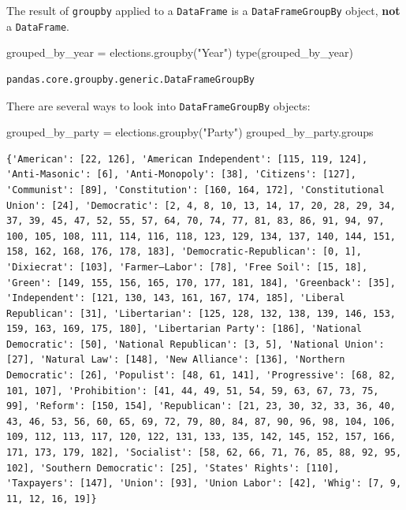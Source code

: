 \documentclass[
  letterpaper,
  DIV=11,
  numbers=noendperiod]{scrreprt}
\newenvironment{Shaded}{\begin{snugshade}}{\end{snugshade}}
\newcommand{\BuiltInTok}[1]{\textcolor[rgb]{0.00,0.23,0.31}{#1}}
\newcommand{\NormalTok}[1]{\textcolor[rgb]{0.00,0.23,0.31}{#1}}
\newcommand{\OperatorTok}[1]{\textcolor[rgb]{0.37,0.37,0.37}{#1}}
\newcommand{\StringTok}[1]{\textcolor[rgb]{0.13,0.47,0.30}{#1}}
\begin{document}
The result of \texttt{groupby} applied to a \texttt{DataFrame} is a
\texttt{DataFrameGroupBy} object, \textbf{not} a \texttt{DataFrame}.

\begin{Shaded}
\begin{Highlighting}[]
\NormalTok{grouped\_by\_year }\OperatorTok{=}\NormalTok{ elections.groupby(}\StringTok{"Year"}\NormalTok{)}
\BuiltInTok{type}\NormalTok{(grouped\_by\_year)}
\end{Highlighting}
\end{Shaded}

\begin{verbatim}
pandas.core.groupby.generic.DataFrameGroupBy
\end{verbatim}

There are several ways to look into \texttt{DataFrameGroupBy} objects:

\begin{Shaded}
\begin{Highlighting}[]
\NormalTok{grouped\_by\_party }\OperatorTok{=}\NormalTok{ elections.groupby(}\StringTok{"Party"}\NormalTok{)}
\NormalTok{grouped\_by\_party.groups}
\end{Highlighting}
\end{Shaded}

\begin{verbatim}
{'American': [22, 126], 'American Independent': [115, 119, 124], 'Anti-Masonic': [6], 'Anti-Monopoly': [38], 'Citizens': [127], 'Communist': [89], 'Constitution': [160, 164, 172], 'Constitutional Union': [24], 'Democratic': [2, 4, 8, 10, 13, 14, 17, 20, 28, 29, 34, 37, 39, 45, 47, 52, 55, 57, 64, 70, 74, 77, 81, 83, 86, 91, 94, 97, 100, 105, 108, 111, 114, 116, 118, 123, 129, 134, 137, 140, 144, 151, 158, 162, 168, 176, 178, 183], 'Democratic-Republican': [0, 1], 'Dixiecrat': [103], 'Farmer–Labor': [78], 'Free Soil': [15, 18], 'Green': [149, 155, 156, 165, 170, 177, 181, 184], 'Greenback': [35], 'Independent': [121, 130, 143, 161, 167, 174, 185], 'Liberal Republican': [31], 'Libertarian': [125, 128, 132, 138, 139, 146, 153, 159, 163, 169, 175, 180], 'Libertarian Party': [186], 'National Democratic': [50], 'National Republican': [3, 5], 'National Union': [27], 'Natural Law': [148], 'New Alliance': [136], 'Northern Democratic': [26], 'Populist': [48, 61, 141], 'Progressive': [68, 82, 101, 107], 'Prohibition': [41, 44, 49, 51, 54, 59, 63, 67, 73, 75, 99], 'Reform': [150, 154], 'Republican': [21, 23, 30, 32, 33, 36, 40, 43, 46, 53, 56, 60, 65, 69, 72, 79, 80, 84, 87, 90, 96, 98, 104, 106, 109, 112, 113, 117, 120, 122, 131, 133, 135, 142, 145, 152, 157, 166, 171, 173, 179, 182], 'Socialist': [58, 62, 66, 71, 76, 85, 88, 92, 95, 102], 'Southern Democratic': [25], 'States' Rights': [110], 'Taxpayers': [147], 'Union': [93], 'Union Labor': [42], 'Whig': [7, 9, 11, 12, 16, 19]}
\end{verbatim}
\end{document}
